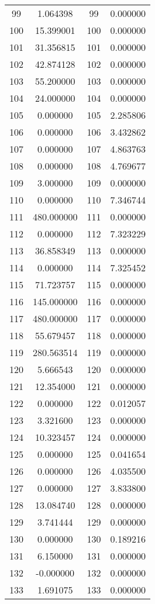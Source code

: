 \documentclass[12pt]{article}
\begin{document}
\begin{longtable}{@{}cccc@{}}
99 & 1.064398 & 99 & 0.000000 \\
100 & 15.399001 & 100 & 0.000000 \\
101 & 31.356815 & 101 & 0.000000 \\
102 & 42.874128 & 102 & 0.000000 \\
103 & 55.200000 & 103 & 0.000000 \\
104 & 24.000000 & 104 & 0.000000 \\
105 & 0.000000 & 105 & 2.285806 \\
106 & 0.000000 & 106 & 3.432862 \\
107 & 0.000000 & 107 & 4.863763 \\
108 & 0.000000 & 108 & 4.769677 \\
109 & 3.000000 & 109 & 0.000000 \\
110 & 0.000000 & 110 & 7.346744 \\
111 & 480.000000 & 111 & 0.000000 \\
112 & 0.000000 & 112 & 7.323229 \\
113 & 36.858349 & 113 & 0.000000 \\
114 & 0.000000 & 114 & 7.325452 \\
115 & 71.723757 & 115 & 0.000000 \\
116 & 145.000000 & 116 & 0.000000 \\
117 & 480.000000 & 117 & 0.000000 \\
118 & 55.679457 & 118 & 0.000000 \\
119 & 280.563514 & 119 & 0.000000 \\
120 & 5.666543 & 120 & 0.000000 \\
121 & 12.354000 & 121 & 0.000000 \\
122 & 0.000000 & 122 & 0.012057 \\
123 & 3.321600 & 123 & 0.000000 \\
124 & 10.323457 & 124 & 0.000000 \\
125 & 0.000000 & 125 & 0.041654 \\
126 & 0.000000 & 126 & 4.035500 \\
127 & 0.000000 & 127 & 3.833800 \\
128 & 13.084740 & 128 & 0.000000 \\
129 & 3.741444 & 129 & 0.000000 \\
130 & 0.000000 & 130 & 0.189216 \\
131 & 6.150000 & 131 & 0.000000 \\
132 & -0.000000 & 132 & 0.000000 \\
133 & 1.691075 & 133 & 0.000000 \\

\end{longtable}
\end{document}
